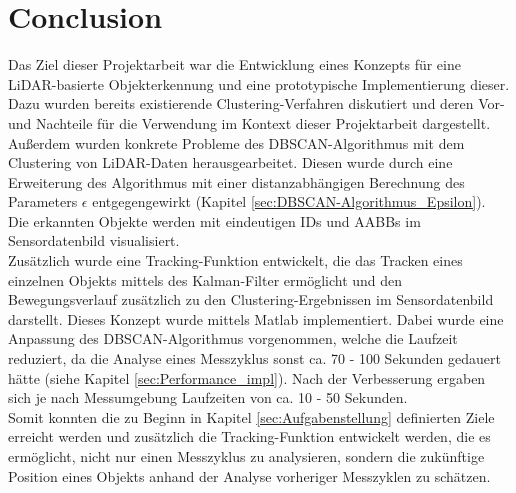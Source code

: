 
\chapter{Conclusion}\label{cha:Conclusion}

Das Ziel dieser Projektarbeit war die Entwicklung eines Konzepts für eine \ac{LiDAR}-basierte Objekterkennung und eine prototypische Implementierung dieser.
Dazu wurden bereits existierende Clustering-Verfahren diskutiert und deren Vor- und Nachteile für die Verwendung im Kontext dieser Projektarbeit dargestellt. Außerdem wurden konkrete Probleme des \ac{DBSCAN}-Algorithmus mit dem Clustering von \ac{LiDAR}-Daten herausgearbeitet. Diesen wurde durch eine Erweiterung des Algorithmus mit einer distanzabhängigen Berechnung des Parameters $\epsilon$ entgegengewirkt (Kapitel \ref{sec:DBSCAN-Algorithmus_Epsilon}).\\
Die erkannten Objekte werden mit eindeutigen IDs und \ac{AABB}s im Sensordatenbild visualisiert.\\
Zusätzlich wurde eine Tracking-Funktion entwickelt, die das Tracken eines einzelnen Objekts mittels des Kalman-Filter ermöglicht und den Bewegungsverlauf zusätzlich zu den Clustering-Ergebnissen im Sensordatenbild darstellt.
Dieses Konzept wurde mittels Matlab implementiert. Dabei wurde eine Anpassung des \ac{DBSCAN}-Algorithmus vorgenommen, welche die Laufzeit reduziert, da die Analyse eines Messzyklus sonst ca. 70 - 100 Sekunden gedauert hätte (siehe Kapitel \ref{sec:Performance_impl}). Nach der Verbesserung ergaben sich je nach Messumgebung Laufzeiten von ca. 10 - 50 Sekunden.\\
Somit konnten die zu Beginn in Kapitel \ref{sec:Aufgabenstellung} definierten Ziele erreicht werden und zusätzlich die Tracking-Funktion entwickelt werden, die es ermöglicht, nicht nur einen Messzyklus zu analysieren, sondern die zukünftige Position eines Objekts anhand der Analyse vorheriger Messzyklen zu schätzen.
